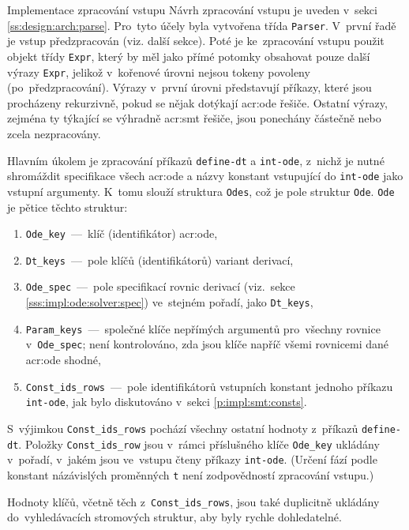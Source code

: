 \documentclass[thesis=M,czech]{FITthesis}[2012/06/26]
\newcommand{\acrlabel}[1]{acr:#1}
\newcommand{\acr}[1]{\acrshort{\acrlabel{#1}}}
\newcommand{\id}[1]{\texttt{#1}}
\newcommand{\rf}[1]{\ref{#1}}
\begin{document}

\begin{section}{Implementace zpracování vstupu}\label{s:impl:parse}
Návrh zpracování vstupu je uveden v~sekci \rf{ss:design:arch:parse}.
Pro~tyto účely byla vytvořena třída \id{Parser}.
V~první řadě je vstup předzpracován (viz. další sekce).
Poté je ke~zpracování vstupu použit objekt třídy \id{Expr},
který by měl jako přímé potomky obsahovat pouze další výrazy \id{Expr},
jelikož v~kořenové úrovni nejsou tokeny povoleny
(po~předzpracování).
Výrazy v~první úrovni představují příkazy,
které jsou procházeny rekurzivně,
pokud se nějak dotýkají \acr{ode} řešiče.
Ostatní výrazy, zejména ty týkající se výhradně \acr{smt} řešiče,
jsou ponechány částečně nebo zcela nezpracovány.

Hlavním úkolem je zpracování příkazů \id{define\--dt} a \id{int\--ode},
z~nichž je nutné shromáždit specifikace všech \acr{ode}
a názvy konstant vstupující do \id{int\--ode} jako vstupní argumenty.
K~tomu slouží struktura \id{Odes},
což je pole struktur \id{Ode}.
\id{Ode} je pětice těchto struktur:
\begin{enumerate}
\item \id{Ode\_\-key}~---~klíč (identifikátor) \acr{ode},
\item \id{Dt\_\-keys}~---~pole klíčů (identifikátorů) variant derivací,
\item \id{Ode\_\-spec}~---~pole specifikací rovnic derivací
   (viz.~sekce \rf{sss:impl:ode:solver:spec})
   ve~stejném pořadí, jako \id{Dt\_\-keys},
\item \id{Param\_\-keys}~---~společné klíče nepřímých argumentů
   pro~všechny rovnice v~\id{Ode\_\-spec};
   není kontrolováno, zda jsou klíče napříč všemi rovnicemi
   dané \acr{ode} shodné,
\item \id{Const\_\-ids\_\-rows}~---~pole identifikátorů
   vstupních konstant jednoho příkazu \id{int\--ode},
   jak bylo diskutováno v~sekci \rf{p:impl:smt:consts}.
\end{enumerate}
S~výjimkou \id{Const\_\-ids\_\-rows}
pochází všechny ostatní hodnoty
z~příkazů \id{define\--dt}.
Položky \id{Const\_\-ids\_\-row} jsou v~rámci
příslušného klíče \id{Ode\_\-key} ukládány v~pořadí,
v~jakém jsou ve~vstupu čteny příkazy \id{int\--ode}.
(Určení fází podle konstant názávislých proměnných \id{t}
není zodpovědností zpracování vstupu.)

Hodnoty klíčů, včetně těch z~\id{Const\_\-ids\_\-rows},
jsou také duplicitně ukládány
do~vyhledávacích stromových struktur,
aby byly rychle dohledatelné.


\end{section}
\end{document}
